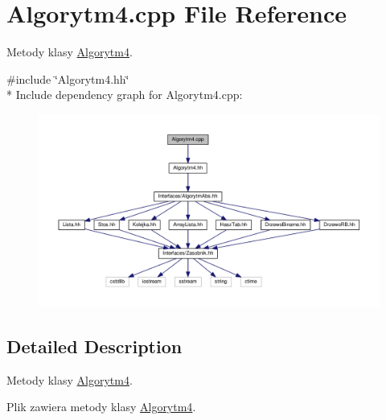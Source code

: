 \hypertarget{a00026}{}\section{Algorytm4.\+cpp File Reference}
\label{a00026}


Metody klasy \hyperlink{a00005}{Algorytm4}.  


{\ttfamily \#include \char`\"{}Algorytm4.\+hh\char`\"{}}\\*
Include dependency graph for Algorytm4.\+cpp\+:
\nopagebreak
\begin{figure}[H]
\begin{center}
\leavevmode
\includegraphics[width=350pt]{a00069}
\end{center}
\end{figure}


\subsection{Detailed Description}
Metody klasy \hyperlink{a00005}{Algorytm4}. 

Plik zawiera metody klasy \hyperlink{a00005}{Algorytm4}. 